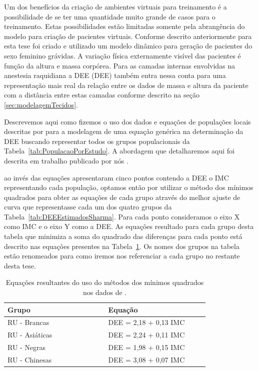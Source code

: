 Um dos benefícios da criação de ambientes virtuais para treinamento é a possibilidade de se ter uma quantidade muito grande de casos para o treinamento. Estas possibilidades estão limitadas somente pela abrangência do modelo para criação de pacientes virtuais. Conforme descrito anteriormente para esta tese foi criado e utilizado um modelo dinâmico para geração de pacientes do sexo feminino grávidas. A variação física externamente visível das pacientes é função da altura e massa corpórea. Para as camadas internas envolvidas na anestesia raquidiana a \acrlong{DEE} (\acrshort{DEE}) também entra nessa conta para uma representação mais real da relação entre os dados de massa e altura da paciente com a distância entre estas camadas conforme descrito na seção \ref{sec:modelagemTecidos}. 

Descrevemos aqui como fizemos o uso dos dados e equações de populações locais descritas por \textcite{Clinkscales2007, Sharma2011, Hazarika2016} para a modelagem de uma equação genérica na determinação da \acrshort{DEE} buscando representar todos os grupos populacionais da Tabela~\ref{tab:PopulacaoPorEstudo}.
A abordagem que detalharemos aqui foi descrita em trabalho publicado por nós \cite{Melo2020}.

\textcite{Sharma2011} ao invés das equações apresentaram cinco pontos contendo a \acrshort{DEE} o \acrshort{IMC} representando cada população, optamos então por utilizar o método dos mínimos quadrados para obter as equações de cada grupo através do melhor ajuste de curva que representasse cada um dos quatro grupos da Tabela~\ref{tab:DEEEstimadosSharma}. Para cada ponto consideramos o eixo X como \acrshort{IMC} e o eixo Y como a \acrshort{DEE}. As equações resultado para cada grupo desta tabela que minimiza a soma do quadrado das diferenças para cada ponto está descrito nas equações presentes na Tabela~\ref{tab:DEEEquacoesMinimosQuadrados}. Os nomes dos grupos na tabela estão renomeados para como iremos nos referenciar a cada grupo no restante desta tese.

\begin{table}[!ht]
\begin{center}
\caption{Equações resultantes do uso do métodos dos mínimos quadrados nos dados de \textcite{Sharma2011}.}
\label{tab:DEEEquacoesMinimosQuadrados}
\begin{tabular}{|p{0.4\linewidth}|p{0.4\linewidth}|}
\hline
\textbf{Grupo} & \textbf{Equação}\\
\hline\hline
RU - Brancas & DEE = 2,18 + 0,13 IMC\\
RU - Asiáticas & DEE = 2,24 + 0,11 IMC\\
RU - Negras & DEE = 1,98 + 0,15 IMC\\
RU - Chinesas & DEE = 3,08 + 0,07 IMC\\
\hline
\end{tabular}
\end{center}
\end{table}

